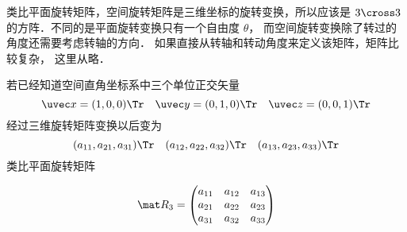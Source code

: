 


类比平面旋转矩阵，空间旋转矩阵是三维坐标的旋转变换，所以应该是 $3 \cross 3$ 的方阵．不同的是平面旋转变换只有一个自由度 $\theta $， 而空间旋转变换除了转过的角度还需要考虑转轴的方向． 如果直接从转轴和转动角度来定义该矩阵，矩阵比较复杂， 这里从略．

若已经知道空间直角坐标系中三个单位正交矢量
\begin{equation}
\uvec x=(1,0,0)\Tr \quad \uvec y=(0,1,0)\Tr \quad \uvec z=(0,0,1)\Tr
\end{equation}
 经过三维旋转矩阵变换以后变为 
\begin{equation}
({a_{11}},{a_{21}},{a_{31}})\Tr \quad ({a_{12}},{a_{22}},{a_{32}})\Tr \quad ({a_{13}},{a_{23}},{a_{33}})\Tr
\end{equation}
类比平面旋转矩阵

\begin{equation}
\mat R_3 = \begin{pmatrix}
{{a_{11}}}&{{a_{12}}}&{{a_{13}}}\\
{{a_{21}}}&{{a_{22}}}&{{a_{23}}}\\
{{a_{31}}}&{{a_{32}}}&{{a_{33}}}
\end{pmatrix}\end{equation}

